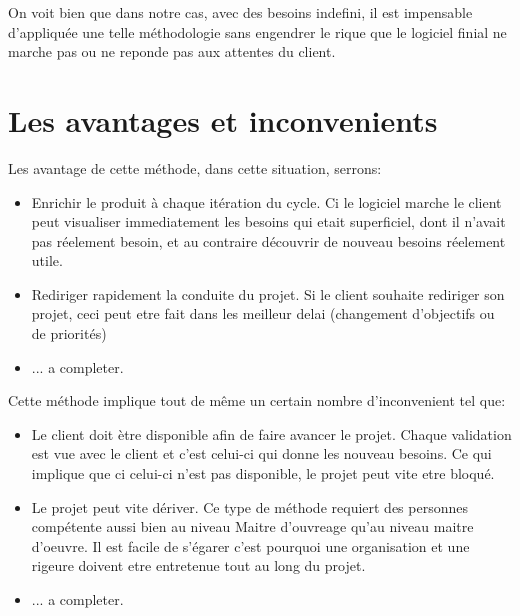 On voit bien que dans notre cas, avec des besoins indefini, il est impensable d'appliquée une telle méthodologie sans engendrer le rique que le logiciel finial ne marche pas ou ne reponde pas aux attentes du client.

\section{Les avantages et inconvenients}
Les avantage de cette méthode, dans cette situation, serrons:
\begin{itemize}
    \item Enrichir le produit à chaque itération du cycle. Ci le logiciel marche le client peut visualiser immediatement les besoins qui etait superficiel, dont il n'avait pas réelement besoin, et au contraire découvrir de nouveau besoins réelement utile.
    \item Rediriger rapidement la conduite du projet. Si le client souhaite rediriger son projet, ceci peut etre fait dans les meilleur delai (changement d'objectifs ou de priorités)
    \item ... a completer.
\end{itemize}\medskip
 
Cette méthode implique tout de même un certain nombre d'inconvenient tel que:
\begin{itemize}
    \item Le client doit ètre disponible afin de faire avancer le projet. Chaque validation est vue avec le client et c'est celui-ci qui donne les nouveau besoins. Ce qui implique que ci celui-ci n'est pas disponible, le projet peut vite etre bloqué. 
    \item Le projet peut vite dériver. Ce type de méthode requiert des personnes compétente aussi bien au niveau Maitre d'ouvreage qu'au niveau maitre d'oeuvre. Il est facile de s'égarer c'est pourquoi une organisation et une rigeure doivent etre entretenue tout au long du projet.
    \item ... a completer.
\end{itemize}\medskip







    
